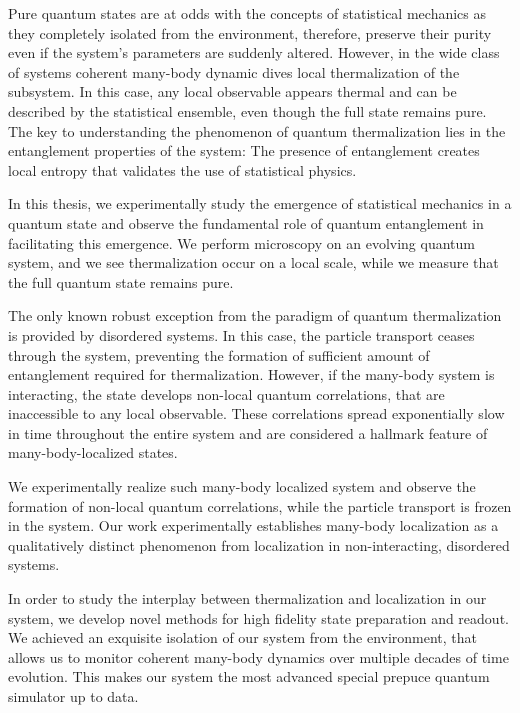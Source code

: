 
Pure quantum states are at odds with the concepts of statistical mechanics as they completely isolated from the environment, therefore, preserve their purity even if the system's parameters are suddenly altered. However, in the wide class of systems coherent many-body dynamic dives local thermalization of the subsystem. In this case, any local observable appears thermal and can be described by the statistical ensemble, even though the full state remains pure. The key to understanding the phenomenon of quantum thermalization lies in the entanglement properties of the system: The presence of entanglement creates local entropy that validates the use of statistical physics.

In this thesis, we experimentally study the emergence of statistical mechanics in a quantum state and observe the fundamental role of quantum entanglement in facilitating this emergence. We perform microscopy on an evolving quantum system, and we see thermalization occur on a local scale, while we measure that the full quantum state remains pure.

The only known robust exception from the paradigm of quantum thermalization is provided by disordered systems. In this case, the particle transport ceases through the system, preventing the formation of sufficient amount of entanglement required for thermalization. However, if the many-body system is interacting, the state develops non-local quantum correlations, that are inaccessible to any local observable. These correlations spread exponentially slow in time throughout the entire system and are considered a hallmark feature of many-body-localized states.

We experimentally realize such many-body localized system and observe the formation of non-local quantum correlations, while the particle transport is frozen in the system. Our work experimentally establishes many-body localization as a qualitatively distinct phenomenon from localization in non-interacting, disordered systems.

In order to study the interplay between thermalization and localization in our system, we develop novel methods for high fidelity state preparation and readout. We achieved an exquisite isolation of our system from the environment, that allows us to monitor coherent many-body dynamics over multiple decades of time evolution. This makes our system the most advanced special prepuce quantum simulator up to data.